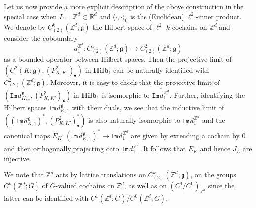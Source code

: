 \documentclass[11pt,reqno]{amsart}
\numberwithin{equation}{section}
\theoremstyle{remark}
\theoremstyle{rmdefinition}
\begin{document}
Let us now provide a more explicit description of the above construction in the special case when $L=\mathbb{Z}^d \subset \mathbb{R}^d$ and $\langle \cdot , \cdot\rangle_0$ is the (Euclidean) $\ell^2$-inner product. We denote by $C^{k}_{(2)}(\mathbb{Z}^d;\mathfrak g)$ the Hilbert space of $\ell^2$ $k$-cochains on $\mathbb{Z}^d$ and consider the coboundary 
$$d_1^{\hspace{1pt}\mathbb{Z}^d}: C^{1}_{(2)}(\mathbb{Z}^d;\mathfrak g) \to C^{2}_{(2)}(\mathbb{Z}^d;\mathfrak g) $$
as a bounded operator between Hilbert spaces. Then the projective limit of $(C^2(K;\mathfrak g),(P^2_{K,K'})_{\bullet})$ in $\mathbf{Hilb}_1$  can  be naturally identified with $C^{2}_{(2)}(\mathbb{Z}^d;\mathfrak g)$. Moreover, it is easy to check that the projective limit of $(\mathtt{Im}\hspace{1pt}d_{K,1}^{\hspace{1pt}\mathfrak g},
(P^2_{K,K'})_{\bullet})$ in $\mathbf{Hilb}_1$ is isomorphic to 
$\overline{\mathtt{Im} \hspace{1pt} d_1^{\hspace{1pt}\mathbb{Z}^d}}$. Further, identifying the Hilbert spaces  $\mathtt{Im}\hspace{1pt}d_{K,1}^{\hspace{1pt}\mathfrak g}$  with their duals, we see that the inductive limit of $((\mathtt{Im}\hspace{1pt}d_{K,1}^{\hspace{1pt}\mathfrak g})^*,
(P^2_{K,K'})^*_{\bullet})$ is also naturally isomorphic to $\overline{\mathtt{Im} \hspace{1pt} d_1^{\hspace{1pt}\mathbb{Z}^d}}$ and the canonical maps $E_K: (\mathtt{Im}\hspace{1pt}d_{K,1}^{\hspace{1pt}\mathfrak g})^* \to
\overline{\mathtt{Im} \hspace{1pt} d_1^{\hspace{1pt}\mathbb{Z}^d}}$ are given by extending a cochain by 0 and then orthogonally projecting onto 
$\overline{\mathtt{Im} \hspace{1pt} d_1^{\hspace{1pt}\mathbb{Z}^d}}$.
It follows that $E_K$ and hence $J_L$ are injective.

We note that $\mathbb{Z}^d$ acts by lattice translations on $C^{k}_{(2)}(\mathbb{Z}^d;\mathfrak g)$, on the groups $C^{k}(\mathbb{Z}^d;G)$ of $G$-valued cochains on $\mathbb{Z}^d$, as well as on $(C^1/C^0)_{\mathbb{Z}^d}$ since the latter can be identified with 
$C^{1}(\mathbb{Z}^d;G)/C^{0}(\mathbb{Z}^d;G)$.
\end{document}
